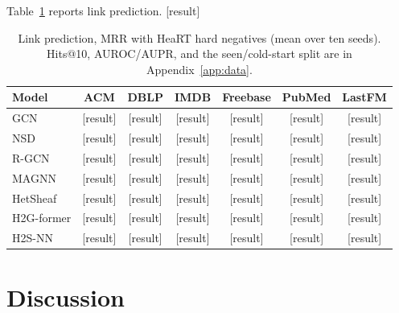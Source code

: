 \documentclass{article}
\newcommand{\method}{\textsc{H2S-NN}}
\newcommand{\res}{{\scriptsize[result]}}
\begin{document}
Table~\ref{tab:link-pred} reports link prediction. \res{}

\begin{table}[t]
  \centering
  \caption{Link prediction, MRR with HeaRT hard negatives (mean over ten seeds). Hits@10, AUROC/AUPR, and the seen/cold-start split are in Appendix~\ref{app:data}.}
  \label{tab:link-pred}
  \footnotesize
  \setlength{\tabcolsep}{2.6pt}
  \begin{tabular}{lcccccc}
    \toprule
    \textbf{Model} & ACM & DBLP & IMDB & Freebase & PubMed & LastFM \\
    \midrule
    GCN & \res & \res & \res & \res & \res & \res \\
    NSD & \res & \res & \res & \res & \res & \res \\
    R-GCN & \res & \res & \res & \res & \res & \res \\
    MAGNN & \res & \res & \res & \res & \res & \res \\
    HetSheaf & \res & \res & \res & \res & \res & \res \\
    H2G-former & \res & \res & \res & \res & \res & \res \\
    \midrule
    \method{} & \res & \res & \res & \res & \res & \res \\
    \bottomrule
  \end{tabular}
\end{table}

\section{Discussion}
\label{sec:discussion}
\end{document}
